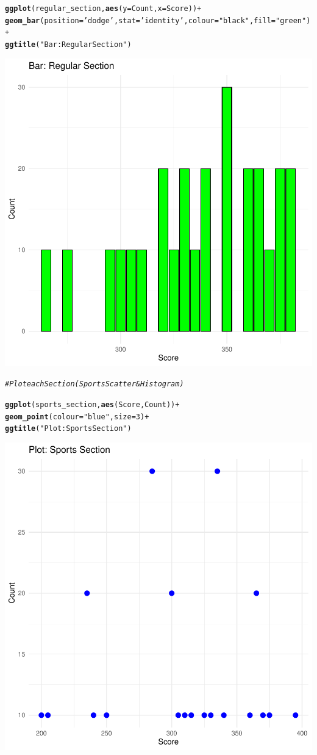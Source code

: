 \documentclass{article}\usepackage[]{graphicx}\usepackage[]{xcolor}
\makeatletter
\newcommand{\hlnum}[1]{\textcolor[rgb]{0.686,0.059,0.569}{#1}}%
\newcommand{\hlstr}[1]{\textcolor[rgb]{0.192,0.494,0.8}{#1}}%
\newcommand{\hlcom}[1]{\textcolor[rgb]{0.678,0.584,0.686}{\textit{#1}}}%
\newcommand{\hlopt}[1]{\textcolor[rgb]{0,0,0}{#1}}%
\newcommand{\hlstd}[1]{\textcolor[rgb]{0.345,0.345,0.345}{#1}}%
\newcommand{\hlkwc}[1]{\textcolor[rgb]{0.333,0.667,0.333}{#1}}%
\newcommand{\hlkwd}[1]{\textcolor[rgb]{0.737,0.353,0.396}{\textbf{#1}}}%
\newenvironment{kframe}{%
 \def\at@end@of@kframe{}%
 \ifinner\ifhmode%
  \def\at@end@of@kframe{\end{minipage}}%
  \begin{minipage}{\columnwidth}%
 \fi\fi%
 \def\FrameCommand##1{\hskip\@totalleftmargin \hskip-\fboxsep
 \colorbox{shadecolor}{##1}\hskip-\fboxsep
     \hskip-\linewidth \hskip-\@totalleftmargin \hskip\columnwidth}%
 \MakeFramed {\advance\hsize-\width
   \@totalleftmargin\z@ \linewidth\hsize
   \@setminipage}}%
 {\par\unskip\endMakeFramed%
 \at@end@of@kframe}
\newenvironment{knitrout}{}{} %
\makeatother
\begin{document}
\begin{knitrout}
{}


\begin{kframe}\begin{alltt}
\hlkwd{ggplot}\hlstd{(regular_section,} \hlkwd{aes}\hlstd{(}\hlkwc{y}\hlstd{=Count,}\hlkwc{x}\hlstd{=Score))} \hlopt{+}
  \hlkwd{geom_bar}\hlstd{(}\hlkwc{position} \hlstd{=} \hlstr{'dodge'}\hlstd{,} \hlkwc{stat}\hlstd{=}\hlstr{'identity'}\hlstd{,}\hlkwc{colour}\hlstd{=}\hlstr{"black"}\hlstd{,}\hlkwc{fill}\hlstd{=}\hlstr{"green"}\hlstd{)} \hlopt{+}
  \hlkwd{ggtitle}\hlstd{(}\hlstr{"Bar: Regular Section"}\hlstd{)}
\end{alltt}
\end{kframe}

{\centering \includegraphics[width=.6\linewidth]{figure/week4-assignment-01-Couto-Maria-Rnwauto-report-2} 

}


\begin{kframe}\begin{alltt}
\hlcom{# Plot each Section (Sports Scatter & Histogram)}

\hlkwd{ggplot}\hlstd{(sports_section,} \hlkwd{aes}\hlstd{(Score, Count))} \hlopt{+}
  \hlkwd{geom_point}\hlstd{(}\hlkwc{colour} \hlstd{=} \hlstr{"blue"}\hlstd{,}\hlkwc{size} \hlstd{=} \hlnum{3}\hlstd{)} \hlopt{+}
  \hlkwd{ggtitle}\hlstd{(}\hlstr{"Plot: Sports Section"}\hlstd{)}
\end{alltt}
\end{kframe}

{\centering \includegraphics[width=.6\linewidth]{figure/week4-assignment-01-Couto-Maria-Rnwauto-report-3} 

}
\end{knitrout}
\end{document}
